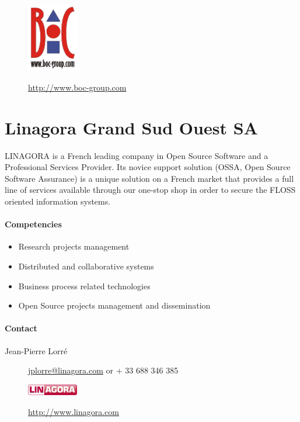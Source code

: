 \documentclass{learnpad}
\begin{document}
\begin{figure}[!htp]
	\centering
	\includegraphics[width=6em,keepaspectratio]{figures/boc-group.png}\par
	\url{http://www.boc-group.com}
\end{figure}

\section{Linagora Grand Sud Ouest SA}
LINAGORA is a French leading company in Open Source Software and a Professional
Services Provider. Its novice support solution (OSSA, Open Source Software
Assurance) is a unique solution on a French market that provides a full line of
services available through our one-stop shop in order to secure the FLOSS
oriented information systems.

\paragraph{Competencies}
\begin{itemize}
	\item Research projects management
	\item Distributed and collaborative systems
	\item Business process related technologies
	\item Open Source projects management and dissemination
\end{itemize}

\paragraph{Contact}
\begin{description}
	\item[Jean-Pierre Lorré] \href{mailto:jplorre@linagora.com}{jplorre@linagora.com} or + 33 688 346 385
\end{description}

\begin{figure}[!htp]
	\centering
	\includegraphics[width=6em,keepaspectratio]{figures/linagora.png}\par
	\url{http://www.linagora.com}
\end{figure}
\end{document}
